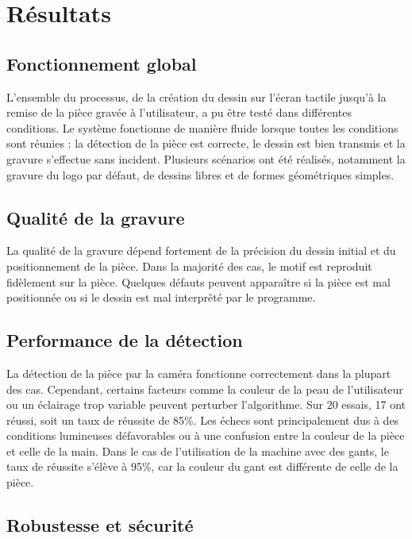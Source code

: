 \chapter{Résultats}

\section{Fonctionnement global}

L'ensemble du processus, de la création du dessin sur l'écran tactile jusqu'à la remise de la pièce gravée à l'utilisateur, a pu être testé dans différentes conditions. Le système fonctionne de manière fluide lorsque toutes les conditions sont réunies : la détection de la pièce est correcte, le dessin est bien transmis et la gravure s'effectue sans incident. Plusieurs scénarios ont été réalisés, notamment la gravure du logo par défaut, de dessins libres et de formes géométriques simples.

\section{Qualité de la gravure}

La qualité de la gravure dépend fortement de la précision du dessin initial et du positionnement de la pièce. Dans la majorité des cas, le motif est reproduit fidèlement sur la pièce. Quelques défauts peuvent apparaître si la pièce est mal positionnée ou si le dessin est mal interprêté par le programme.


\section{Performance de la détection}

La détection de la pièce par la caméra fonctionne correctement dans la plupart des cas. Cependant, certains facteurs comme la couleur de la peau de l'utilisateur ou un éclairage trop variable peuvent perturber l'algorithme. Sur 20 essais, 17 ont réussi, soit un taux de réussite de 85\%. Les échecs sont principalement dus à des conditions lumineuses défavorables ou à une confusion entre la couleur de la pièce et celle de la main. Dans le cas de l'utilisation de la machine avec des gants, le taux de réussite s'élève à 95\%, car la couleur du gant est différente de celle de la pièce.

\section{Robustesse et sécurité}

